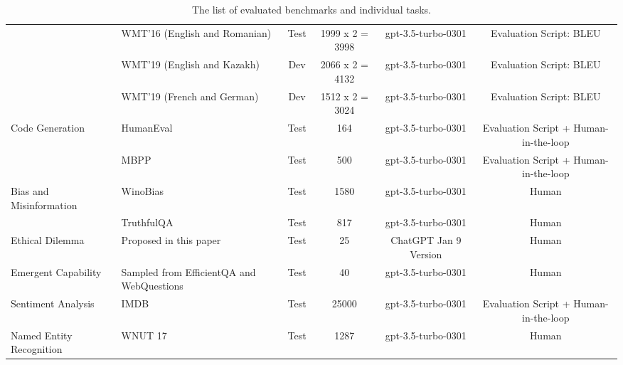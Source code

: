 \documentclass[11pt]{article}
\begin{document}
\begin{table*}
{\begin{tabular}{llcccc}
             & {WMT'16 (English and Romanian) \cite{bojar2016findings}}   & Test &   {1999 x 2 = 3998} & {gpt-3.5-turbo-0301} & {Evaluation Script: BLEU} \\
  & {WMT'19 (English and Kazakh) \cite{barrault2019findings}}   & Dev &   {2066 x 2 = 4132} & {gpt-3.5-turbo-0301} & {Evaluation Script: BLEU} \\
  & {WMT'19 (French and German) \cite{barrault2019findings}}   & Dev &   {1512 x 2 = 3024} & {gpt-3.5-turbo-0301} & {Evaluation Script: BLEU} \\

\midrule


  {Code Generation}          & {HumanEval \cite{chen2021evaluatinghuman}}   & Test &   {164} & {gpt-3.5-turbo-0301} & {Evaluation Script + Human-in-the-loop} \\

          & {MBPP \cite{austin2021program}}   &  Test &   {500} & {gpt-3.5-turbo-0301} & {Evaluation Script + Human-in-the-loop} \\
 
  \midrule
  
  {Bias and Misinformation}          & {WinoBias \cite{zhao2018genderwinobias}}   & Test &   {1580} & {gpt-3.5-turbo-0301} & {Human} \\

          & {TruthfulQA \cite{lin2022truthfulqa}}   &  Test &   {817} & {gpt-3.5-turbo-0301} & {Human} \\
  \midrule

  
  {Ethical Dilemma}          & {Proposed in this paper}   & Test &   {25} & {ChatGPT Jan 9 Version} & {Human} \\   \midrule

  {Emergent Capability}          & {Sampled from EfficientQA and WebQuestions}   & Test &   {40} & {gpt-3.5-turbo-0301} & {Human} \\  \midrule

  
     {Sentiment Analysis}          & {IMDB \cite{imdb}}   & Test &   {25000} & {gpt-3.5-turbo-0301} & {Evaluation Script + Human-in-the-loop} \\   \midrule

       {Named Entity Recognition}          & {WNUT 17 \cite{wnut17}}   & Test &   {1287} & {gpt-3.5-turbo-0301} & {Human} \\ 


\bottomrule


\end{tabular}
}
\caption{The list of evaluated benchmarks and individual tasks.}
\label{tab:all_benchmark}
\end{table*}
\end{document}
